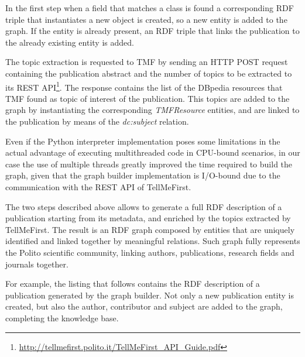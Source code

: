 \documentclass[%
    corpo=13.5pt,
    twoside,
    oldstyle,
    tipotesi=magistrale,
    greek,
    evenboxes
]{toptesi}
\begin{document}
In the first step when a field that matches a class is found a corresponding
RDF triple that instantiates a new object is created, so a new entity is added
to the graph. If the entity is already present, an RDF triple that links the
publication to the already existing entity is added.

The topic extraction is requested to TMF by sending an HTTP POST request
containing the publication abstract and the number of topics to be extracted
to its REST API\footnote{\url{http://tellmefirst.polito.it/TellMeFirst_API_Guide.pdf}}.
The response contains the list of the DBpedia resources that TMF
found as topic of interest of the publication. This topics are added to the
graph by instantiating the corresponding \emph{TMFResource} entities, and are
linked to the publication by means of the \emph{dc:subject} relation.

Even if the Python interpreter implementation poses some limitations in the
actual advantage of executing multithreaded code in CPU-bound scenarios, in our
case the use of multiple threads greatly improved the time required to build
the graph, given that the graph builder implementation is I/O-bound due to
the communication with the REST API of TellMeFirst.

The two steps described above allows to generate a full RDF description of a
publication starting from its metadata, and enriched by the topics extracted
by TellMeFirst. The result is an RDF graph composed by entities that are
uniquely identified and linked together by meaningful relations. Such graph
fully represents the Polito scientific community, linking authors,
publications, research fields and journals together.

For example, the listing that follows contains the RDF description of a
publication generated by the graph builder. Not only a new publication entity
is created, but also the author, contributor and subject are added to the graph,
completing the knowledge base.
\end{document}
